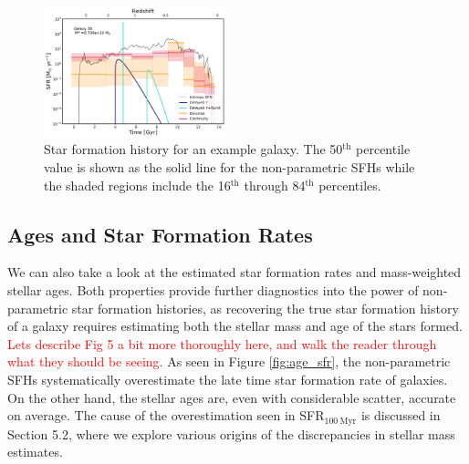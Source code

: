 \documentclass[twocolumn]{aastex62}
\newcommand{\red}[1]{{\textcolor{red}{#1}}}
\begin{document}
\begin{figure}[h]

\centering
\includegraphics[width=0.47\textwidth]{SFH_38.png}

\caption{Star formation history for an example galaxy. The 50$^{\mathrm{th}}$ percentile value is shown as the solid line for the non-parametric SFHs while the shaded regions include the 16$^{\mathrm{th}}$ through 84$^{\mathrm{th}}$ percentiles.}
\label{fig:sfh}

\end{figure}



\subsection{Ages and Star Formation Rates}

We can also take a look at the estimated star formation rates and mass-weighted stellar ages. Both properties provide further diagnostics into the power of non-parametric star formation histories, as recovering the true star formation history of a galaxy requires estimating both the stellar mass and age of the stars formed. \red{Lets describe Fig 5 a bit more thoroughly here, and walk the reader through what they should be seeing.} As seen in Figure \ref{fig:age_sfr}, the non-parametric SFHs systematically overestimate the late time star formation rate of galaxies. On the other hand, the stellar ages are, even with considerable scatter, accurate on average. The cause of the overestimation seen in SFR$_{100 \: \mathrm{Myr}}$ is discussed in Section 5.2, where we explore various origins of the discrepancies in stellar mass estimates.
\end{document}
